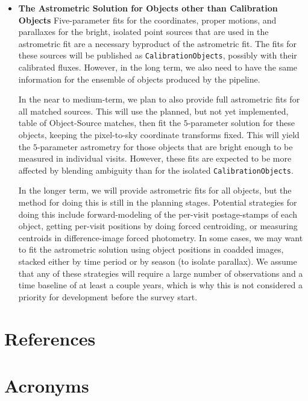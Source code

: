 \documentclass[DM,authoryear,toc]{lsstdoc}
\begin{document}
\begin{itemize}
\item \textbf{The Astrometric Solution for Objects other than Calibration Objects} Five-parameter fits for the coordinates, proper motions, and parallaxes for the bright, isolated point sources that are used in the astrometric fit are a necessary byproduct of the astrometric fit. The fits for these sources will be published as \texttt{CalibrationObjects}, possibly with their calibrated fluxes. However, in the long term, we also need to have the same information for the ensemble of objects produced by the pipeline.

In the near to medium-term, we plan to also provide full astrometric fits for all matched sources. This will use the planned, but not yet implemented, table of Object-Source matches, then fit the $5$-parameter solution for these objects, keeping the pixel-to-sky coordinate transforms fixed. This will yield the $5$-parameter astrometry for those objects that are bright enough to be measured in individual visits. However, these fits are expected to be more affected by blending ambiguity than for the isolated \texttt{CalibrationObjects}.

In the longer term, we will provide astrometric fits for all objects, but the method for doing this is still in the planning stages. Potential strategies for doing this include forward-modeling of the per-visit postage-stamps of each object, getting per-visit positions by doing forced centroiding, or measuring centroids in difference-image forced photometry. In some cases, we may want to fit the astrometric solution using object positions in coadded images, stacked either by time period or by season (to isolate parallax). We assume that any of these strategies will require a large number of observations and a time baseline of at least a couple years, which is why this is not considered a priority for development before the survey start.
\end{itemize}


\appendix
\section{References} \label{sec:bib}
\renewcommand{\refname}{} %


\section{Acronyms} \label{sec:acronyms}

\end{document}
